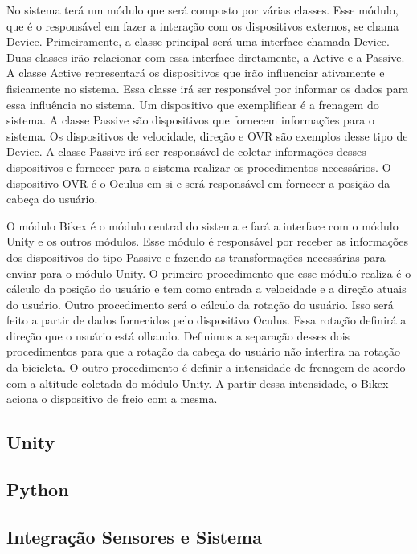 No sistema terá um módulo que será composto por várias classes. Esse módulo, que é o responsável em fazer a interação com os dispositivos externos, se chama Device. Primeiramente, a classe principal será uma interface chamada Device. Duas classes irão relacionar com essa interface diretamente, a Active e a Passive. A classe Active representará os dispositivos que irão influenciar ativamente e fisicamente no sistema. Essa classe irá ser responsável por informar os dados para essa influência no sistema. Um dispositivo que exemplificar é a frenagem do sistema. A classe Passive são dispositivos que fornecem informações para o sistema. Os dispositivos de velocidade, direção e OVR são exemplos desse tipo de Device. A classe Passive irá ser responsável de coletar informações desses dispositivos e fornecer para o sistema realizar os procedimentos necessários. O dispositivo OVR é o Oculus em si e será responsável em fornecer a posição da cabeça do usuário.

O módulo Bikex é o módulo central do sistema e fará a interface com o módulo Unity e os outros módulos. Esse módulo é responsável por receber as informações dos dispositivos do tipo Passive e fazendo as transformações necessárias para enviar para o módulo Unity. O primeiro procedimento que esse módulo realiza é o cálculo da posição do usuário e tem como entrada a velocidade e a direção atuais do usuário. Outro procedimento será o cálculo da rotação do usuário. Isso será feito a partir de dados fornecidos pelo dispositivo Oculus. Essa rotação definirá a direção que o usuário está olhando. Definimos a separação desses dois procedimentos para que a rotação da cabeça do usuário não interfira na rotação da bicicleta. O outro procedimento é definir a intensidade de frenagem de acordo com a altitude coletada do módulo Unity. A partir dessa intensidade, o Bikex aciona o dispositivo de freio com a mesma.



\subsection{Unity}

\subsection{Python}

\subsection{Integração Sensores e Sistema}
